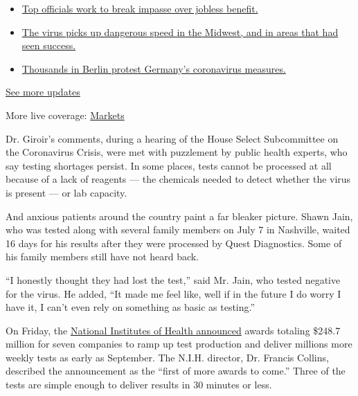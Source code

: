 \begin{itemize}
\tightlist
\item
  \href{https://www.nytimes.com/2020/08/01/world/coronavirus-covid-19.html?action=click\&pgtype=Article\&state=default\&region=MAIN_CONTENT_1\&context=storylines_live_updates\#link-3ac56579}{Top
  officials work to break impasse over jobless benefit.}
\item
  \href{https://www.nytimes.com/2020/08/01/world/coronavirus-covid-19.html?action=click\&pgtype=Article\&state=default\&region=MAIN_CONTENT_1\&context=storylines_live_updates\#link-8796723}{The
  virus picks up dangerous speed in the Midwest, and in areas that had
  seen success.}
\item
  \href{https://www.nytimes.com/2020/08/01/world/coronavirus-covid-19.html?action=click\&pgtype=Article\&state=default\&region=MAIN_CONTENT_1\&context=storylines_live_updates\#link-25930521}{Thousands
  in Berlin protest Germany's coronavirus measures.}
\end{itemize}

\href{https://www.nytimes.com/2020/08/01/world/coronavirus-covid-19.html?action=click\&pgtype=Article\&state=default\&region=MAIN_CONTENT_1\&context=storylines_live_updates}{See
more updates}

More live coverage:
\href{https://www.nytimes.com/live/2020/07/31/business/stock-market-today-coronavirus?action=click\&pgtype=Article\&state=default\&region=MAIN_CONTENT_1\&context=storylines_live_updates}{Markets}

Dr. Giroir's comments, during a hearing of the House Select Subcommittee
on the Coronavirus Crisis, were met with puzzlement by public health
experts, who say testing shortages persist. In some places, tests cannot
be processed at all because of a lack of reagents --- the chemicals
needed to detect whether the virus is present --- or lab capacity.

And anxious patients around the country paint a far bleaker picture.
Shawn Jain, who was tested along with several family members on July 7
in Nashville, waited 16 days for his results after they were processed
by Quest Diagnostics. Some of his family members still have not heard
back.

``I honestly thought they had lost the test,'' said Mr. Jain, who tested
negative for the virus. He added, ``It made me feel like, well if in the
future I do worry I have it, I can't even rely on something as basic as
testing.''

On Friday, the
\href{https://www.nih.gov/news-events/news-releases/nih-delivering-new-covid-19-testing-technologies-meet-us-demand}{National
Institutes of Health announced} awards totaling \$248.7 million for
seven companies to ramp up test production and deliver millions more
weekly tests as early as September. The N.I.H. director, Dr. Francis
Collins, described the announcement as the ``first of more awards to
come.'' Three of the tests are simple enough to deliver results in 30
minutes or less.

